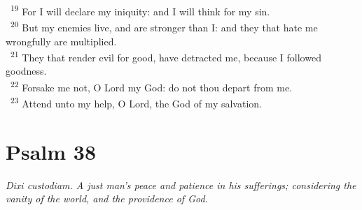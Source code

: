 \documentclass[a5paper,12pt]{article}
\begin{document}
\begin{multicols*}{2}
~\textsuperscript{19} For I will declare my iniquity: and I will think for my sin.\\
~\textsuperscript{20} But my enemies live, and are stronger than I: and they that hate me wrongfully are multiplied.\\
~\textsuperscript{21} They that render evil for good, have detracted me, because I followed goodness.\\
~\textsuperscript{22} Forsake me not, O Lord my God: do not thou depart from me.\\
~\textsuperscript{23} Attend unto my help, O Lord, the God of my salvation.\\

\section{Psalm 38}
\label{sec:orgd0a09d1}
\emph{Dixi custodiam. A just man's peace and patience in his sufferings; considering the vanity of the world, and the providence of God.}\\


\end{multicols*}
\end{document}
